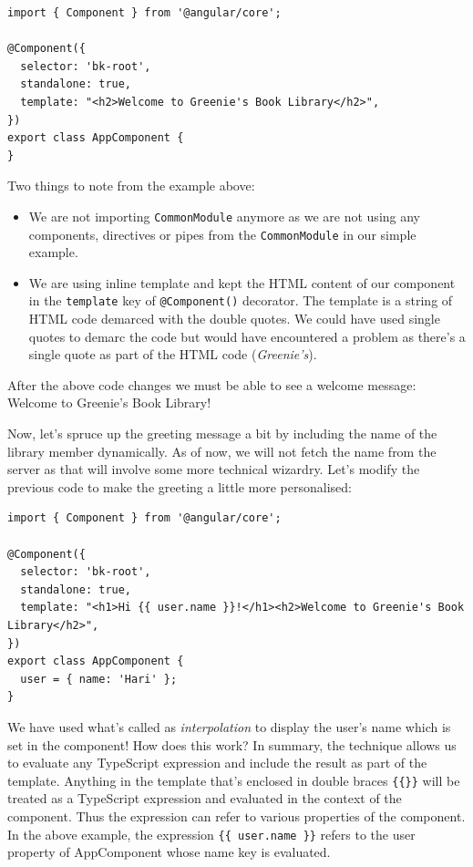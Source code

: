 \documentclass{report}
\begin{document}
\begin{Verbatim}[label=v2.1.0]
import { Component } from '@angular/core';

@Component({
  selector: 'bk-root',
  standalone: true,
  template: "<h2>Welcome to Greenie's Book Library</h2>",
})
export class AppComponent {
}
\end{Verbatim}

Two things to note from the example above:
\begin{itemize}
\item We are not importing \verb|CommonModule| anymore as we are not using any components, directives or pipes from the \verb|CommonModule| in our simple example.
\item We are using inline template and kept the HTML content of our component in the \verb|template| key of \verb|@Component()| decorator. The template is a string of HTML code demarced with the double quotes. We could have used single quotes to demarc the code but would have encountered a problem as there's a single quote as part of the HTML code (\textsl{Greenie's}).
\end{itemize}

After the above code changes we must be able to see a welcome message: Welcome to Greenie's Book Library!

Now, let's spruce up the greeting message a bit by including the name of the library member dynamically. As of now, we will not fetch the name from the server as that will involve some more technical wizardry. Let's modify the previous code to make the greeting a little more personalised:

\begin{Verbatim}[label=v2.1.1]
import { Component } from '@angular/core';

@Component({
  selector: 'bk-root',
  standalone: true,
  template: "<h1>Hi {{ user.name }}!</h1><h2>Welcome to Greenie's Book Library</h2>",
})
export class AppComponent {
  user = { name: 'Hari' };
}
\end{Verbatim}

We have used what's called as \textsl{interpolation} to display the user's name which is set in the component! How does this work? In summary, the technique allows us to evaluate any TypeScript expression and include the result as part of the template. Anything in the template that's enclosed in double braces \verb|{{}}| will be treated as a TypeScript expression and evaluated in the context of the component. Thus the expression can refer to various properties of the component. In the above example, the expression \verb|{{ user.name }}| refers to the user property of AppComponent whose name key is evaluated.
\end{document}
